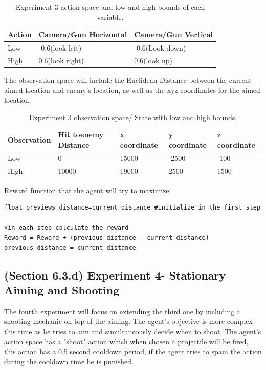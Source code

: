 \documentclass[a4paper,one side,12pt]{book}
\begin{document}
\begin{table}[H]
  \centering  
  \begin{tabular}
  {|m{2.5em}||m{6em}||m{6em}|}
  \hline
       Action &Camera/Gun Horizontal	&Camera/Gun Vertical \\
  \hline    
  \hline       					
Low	&-0.6(look left)	&-0.6(Look down)\\
\hline   
High &0.6(look right)	&0.6(look up)\\

       \hline
  \end{tabular}
  \caption{Experiment 3 action space and low and high bounds
of each variable.}
\end{table} 

The observation space will include the Euclidean Distance between the current aimed location 
and enemy's location, as well as the xyz coordinates for the aimed location.
\begin{table}[H]
  \centering  
  \begin{tabular}
  {|m{5em}||m{3.5em}||m{5em}||m{5em}||m{5em}|}
  \hline
       Observation &Hit to\newline enemy Distance &x coordinate &y coordinate &z coordinate\\
  \hline    
  \hline       					
Low	&0 &15000 &-2500 &-100\\
\hline   
High &10000 &19000 &2500 &1500\\

       \hline
  \end{tabular}
  \caption{Experiment 3 observation space/ State with low and high bounds.}
\end{table} 

Reward function that the agent will try to maximize:

\begin{verbatim}
float previews_distance=current_distance #initialize in the first step

#in each step calculate the reward
Reward = Reward + (previous_distance - current_distance)
previous_distance = current_distance
\end{verbatim}


\subsection{(Section 6.3.d) Experiment 4- Stationary Aiming and Shooting}

The fourth experiment will focus on extending the third one by including a shooting mechanic on top of the aiming. The agent's objective is more complex this time as he tries to aim and simultaneously decide when to shoot. 
The agent's action space has a "shoot" action which when chosen a projectile will be fired, this action has a 0.5 second cooldown period, if the agent tries to spam the action during
the cooldown time he is punished.
\end{document}
